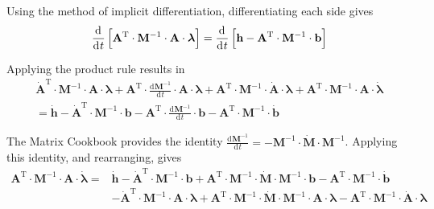 \documentclass[11pt]{article}
\newcommand{\oD}[2]{
    \frac{\mathrm{d}\mspace{1mu}#1}{\mathrm{d}\mspace{1mu}#2}
}
\begin{document}
Using the method of implicit differentiation, differentiating each side gives
\begin{equation}
    \oD{}{t}\sbr{\mathbf{A}^{\mathrm{T}} \cdot \mathbf{M}^{-1} \cdot \mathbf{A} \cdot \bm{\lambda}} =
        \oD{}{t}\sbr{\mathbf{h} - \mathbf{A}^{\mathrm{T}} \cdot \mathbf{M}^{-1} \cdot \mathbf{b}}
\end{equation}

Applying the product rule results in
\begin{align}
    \dot{\mathbf{A}}^{\mathrm{T}} \cdot \mathbf{M}^{-1} \cdot \mathbf{A} \cdot \bm{\lambda}
    + \mathbf{A}^{\mathrm{T}} \cdot \oD{\mathbf{M}^{-1}}{t} \cdot \mathbf{A} \cdot \bm{\lambda}
    + \mathbf{A}^{\mathrm{T}} \cdot \mathbf{M}^{-1} \cdot \dot{\mathbf{A}} \cdot \bm{\lambda}
    + \mathbf{A}^{\mathrm{T}} \cdot \mathbf{M}^{-1} \cdot \mathbf{A} \cdot \dot{\bm{\lambda}} \nonumber\\
    = \dot{\mathbf{h}}
    - \dot{\mathbf{A}}^{\mathrm{T}} \cdot \mathbf{M}^{-1} \cdot \mathbf{b}
    - \mathbf{A}^{\mathrm{T}} \cdot \oD{\mathbf{M}^{-1}}{t} \cdot \mathbf{b}
    - \mathbf{A}^{\mathrm{T}} \cdot \mathbf{M}^{-1} \cdot \dot{\mathbf{b}}
\end{align}

The Matrix Cookbook \cite{RF1-32} provides the identity $\oD{\mathbf{M}^{-1}}{t} = - \mathbf{M}^{-1} \cdot \dot{\mathbf{M}} \cdot \mathbf{M}^{-1}$. Applying this identity, and rearranging, gives
\begin{align}
    \mathbf{A}^{\mathrm{T}} \cdot \mathbf{M}^{-1} \cdot \mathbf{A} \cdot \dot{\bm{\lambda}}
    =
    &\dot{\mathbf{h}}
    - \dot{\mathbf{A}}^{\mathrm{T}} \cdot \mathbf{M}^{-1} \cdot \mathbf{b}
    + \mathbf{A}^{\mathrm{T}} \cdot \mathbf{M}^{-1} \cdot \dot{\mathbf{M}} \cdot \mathbf{M}^{-1} \cdot \mathbf{b}
    - \mathbf{A}^{\mathrm{T}} \cdot \mathbf{M}^{-1} \cdot \dot{\mathbf{b}} \nonumber\\
    &- \dot{\mathbf{A}}^{\mathrm{T}} \cdot \mathbf{M}^{-1} \cdot \mathbf{A} \cdot \bm{\lambda}
    + \mathbf{A}^{\mathrm{T}} \cdot \mathbf{M}^{-1} \cdot \dot{\mathbf{M}} \cdot \mathbf{M}^{-1} \cdot \mathbf{A} \cdot \bm{\lambda}
    - \mathbf{A}^{\mathrm{T}} \cdot \mathbf{M}^{-1} \cdot \dot{\mathbf{A}} \cdot \bm{\lambda}
\end{align}
\end{document}
